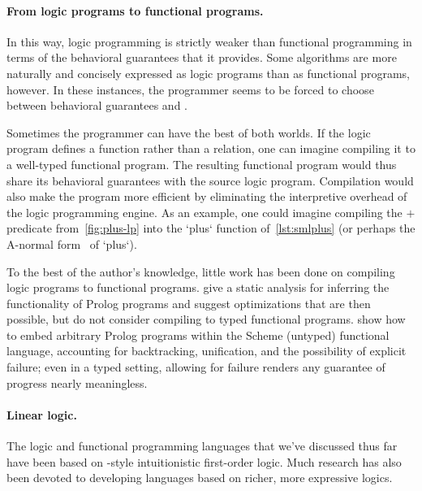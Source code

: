 \paragraph*{From logic programs to functional programs.}
In this way, logic programming is strictly weaker than functional programming in terms of the behavioral guarantees that it provides.
Some algorithms are more naturally and concisely expressed as logic programs than as functional programs, however.
%
In these instances, the programmer seems to be forced to choose between behavioral guarantees and .

Sometimes the programmer can have the best of both worlds.
If the logic program defines a function rather than a relation, one can imagine compiling it to a well-typed functional program.
%
The resulting functional program would thus share its behavioral guarantees with the source logic program.
Compilation would also make the program more efficient by eliminating the interpretive overhead of the logic programming engine.
As an example, one could imagine compiling the $\plus{}$ predicate from~\cref{fig:plus-lp} into the \sml`plus` function of~\cref{lst:smlplus} (or perhaps the A-normal form~\autocite{Sabry+Felleisen:LASC93} of \sml`plus`).

To the best of the author's knowledge, little work has been done on compiling logic programs to functional programs.
\Textcite{Debray+Warren:TOPLAS89} give a static analysis for inferring the functionality of Prolog programs and suggest optimizations that are then possible, but do not consider compiling to typed functional programs.
\Textcites{Felleisen:IU86}{Haynes:JLP86} show how to embed arbitrary Prolog programs within the Scheme (untyped) functional language, accounting for backtracking, unification, and the possibility of explicit failure; even in a typed setting, allowing for failure renders any guarantee of progress nearly meaningless.
\Textcite{Murphy+Reed:06}

\paragraph*{Linear logic.}
The logic and functional programming languages that we've discussed thus far have been based on \citeauthor{Gentzen:MZ35}-style intuitionistic first-order logic.
Much research has also been devoted to developing languages based on richer, more expressive logics.

